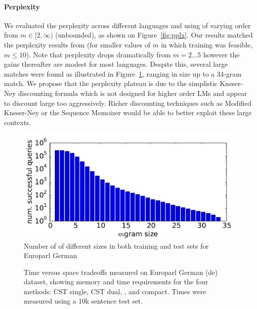 \paragraph{Perplexity}
We evaluated the perplexity across different languages and using \ngrams of varying order from $m\in[2,\infty)$ (unbounded), as shown on Figure~\ref{fig:pplx}.
Our results matched the perplexity results from \SRILM (for smaller values of $m$ in which \SRILM training was feasible, $m \le 10$).
Note that perplexity drops dramatically from $m=2\ldots5$ however the gains thereafter are modest for most languages.
Despite this, several large \ngram matches were found as illustrated in Figure~\ref{fig:germanpattern}, ranging in size up to a 34-gram match.
We propose that the perplexity plateau is due to the simplistic Kneser-Ney discounting formula which is not designed for higher order \ngram LMs and appear to discount large \ngrams too aggressively. 
Richer discounting techniques such as Modified Kneser-Ney \cite{chen1996empirical} or the Sequence Memoizer \cite{wood2011sequence} would be able to better exploit these large contexts.


\begin{figure}[tb]
\includegraphics[width=\columnwidth]{figures/german_pattern_size.pdf}
\caption{Number of \ngrams of different sizes in both training and test sets for Europarl German}
\label{fig:germanpattern}
\end{figure}

\begin{figure}[tb]

\caption{Time versus space tradeoffs measured on Europarl German (de) dataset, showing memory and time requirements for the four methods: CST single, CST dual, \SRILM, and \SRILM compact. Times were measured using a 10k sentence test set.}
\label{fig:spacetime}
\end{figure}

